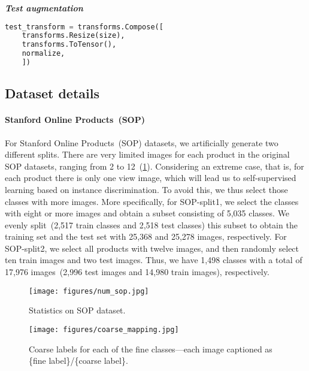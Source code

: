 \documentclass[10pt,twocolumn,letterpaper]{article}
\begin{document}
\noindent\textit{\textbf{Test augmentation}}
\begin{lstlisting}[language=Python]
test_transform = transforms.Compose([
    transforms.Resize(size),
    transforms.ToTensor(),
    normalize,
    ])
\end{lstlisting}




\subsection{Dataset details}
\paragraph{Stanford Online Products~(SOP)}
For Stanford Online Products~(SOP) datasets, we artificially generate two different splits. There are very limited images for each product in the original SOP datasets, ranging from 2 to 12~(\cref{fig:sop_statistics}). Considering an extreme case, that is, for each product there is only one view image, which will lead us to self-supervised learning based on instance discrimination. To avoid this, we thus select those classes with more images. More specifically, for SOP-split1, we select the classes with eight or more images and obtain a subset consisting of 5,035 classes. We evenly split~(2,517 train classes and 2,518 test classes) this subset to obtain the training set and the test set with 25,368 and 25,278 images, respectively. For SOP-split2, we select all products with twelve images, and then randomly select ten train images and two test images. Thus, we have 1,498 classes with a total of 17,976 images~(2,996 test images and 14,980 train images), respectively.
\begin{figure}[htbp]
    \centering
    \texttt{[image: figures/num\_sop.jpg]}
    \caption{Statistics on SOP dataset.}
    \label{fig:sop_statistics}
\end{figure}




\begin{figure*}[htbp]
    \centering
    \texttt{[image: figures/coarse\_mapping.jpg]}
    \caption{Coarse labels for each of the fine classes---each image captioned as \{fine label\}/\{coarse label\}.}
    \label{fig:coarse_cars196}
\end{figure*}
\end{document}
